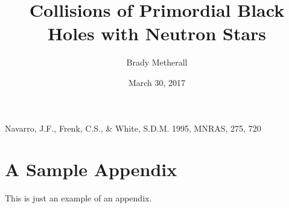 \documentclass{jthesis}
\title{Collisions of Primordial Black Holes with Neutron Stars} %
\author{Brady Metherall}
\date{March 30, 2017}
\begin{document}
\maketitle



\makedeclaration

\maketableofcontents

\doublespacing
\linespread{2}









\begin{thebibliography}{}

 Navarro, J.F., Frenk, C.S., \& White, S.D.M.  1995, MNRAS, 275, 720

\end{thebibliography}

\appendix

\chapter{A Sample Appendix}
\label{app:sample}

This is just an example of an appendix.
\end{document}
